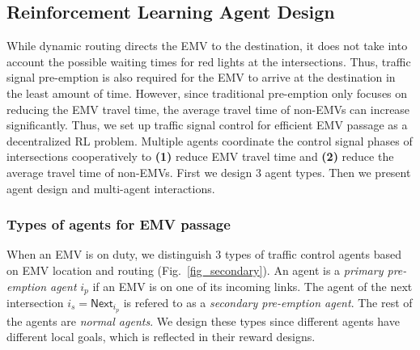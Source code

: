 \subsection{Reinforcement Learning Agent Design}\label{sec:agent_design}
While dynamic routing directs the EMV to the destination, it does not take into account the possible waiting times for red lights at the intersections. Thus, traffic signal pre-emption is also required for the EMV to arrive at the destination in the least amount of time. However, since traditional pre-emption only focuses on reducing the EMV travel time, the average travel time of non-EMVs can increase significantly. Thus, we set up traffic signal control for efficient EMV passage as a decentralized RL problem.  Multiple agents coordinate the control signal phases of intersections cooperatively to \textbf{(1)} reduce EMV travel time and \textbf{(2)} reduce the average travel time of non-EMVs. First we design 3 agent types. Then we present agent design and multi-agent interactions.

\subsubsection{Types of agents for EMV passage}
When an EMV is on duty, we distinguish 3 types of traffic control agents based on EMV location and routing (Fig.~\ref{fig_secondary}). An agent is a \emph{primary pre-emption agent} $i_p$ if an EMV is on one of its incoming links. The agent of the next intersection $i_s = \mathsf{Next}_{i_p}$ is refered to as a \emph{secondary pre-emption agent}.
The rest of the agents are \emph{normal agents}. We design these types since different agents have different local goals, which is reflected in their reward designs. 

